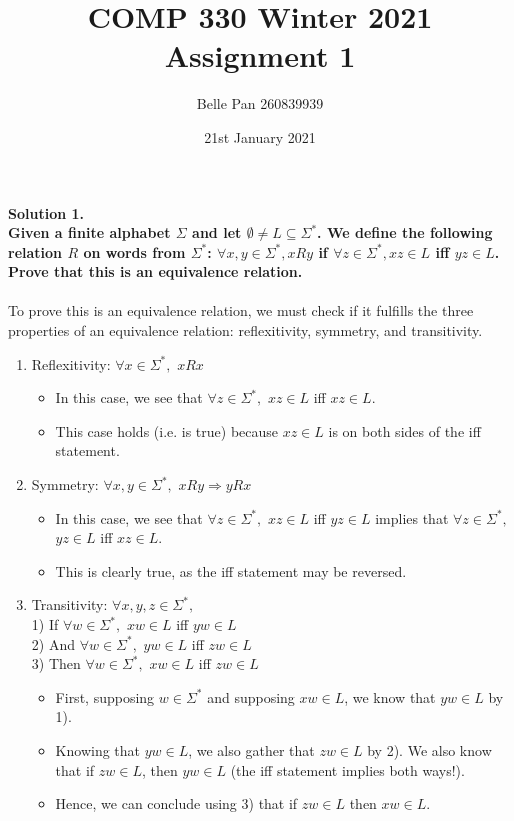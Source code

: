\documentclass{article}
\title{ COMP 330 Winter 2021 \\ Assignment 1}
\author{Belle Pan 260839939}
\date{21st January 2021}
\begin{document}
\maketitle

\noindent \textbf{Solution 1. 
\\Given a finite alphabet \(\Sigma\) and let \(\emptyset \neq L \subseteq \Sigma ^*\). 
We define the following relation \(R\) on words from \(\Sigma ^*\): 
\(\forall x, y \in \Sigma ^*, xRy\) if \(\forall z \in \Sigma^*, xz \in L\) iff \(yz \in L\).
Prove that this is an equivalence relation.}
\\
\\To prove this is an equivalence relation, we must check if it fulfills the three properties of an equivalence relation: reflexitivity, symmetry, and transitivity.
\begin{enumerate}
    \item Reflexitivity: \(\forall x \in \Sigma ^ *,\) \(xRx\)
    \begin{itemize}
        \item In this case, we see that \(\forall z \in \Sigma^*,\) \(xz \in L\) iff \(xz \in L\).
        \item This case holds (i.e. is true) because \(xz \in L\) is on both sides of the iff statement.
    \end{itemize}
    \item Symmetry: \(\forall x,y \in \Sigma ^ *,\) \(xRy \Longrightarrow yRx\)
    \begin{itemize}
        \item In this case, we see that \(\forall z \in \Sigma^*,\) \(xz \in L\) iff \(yz \in L\) implies that \(\forall z \in \Sigma^*,\) \(yz \in L\) iff \(xz \in L\).
        \item This is clearly true, as the iff statement may be reversed.
    \end{itemize}
    \item Transitivity: \(\forall x,y,z \in \Sigma ^ *,\)
    \\1) If \(\forall w \in \Sigma^*,\) \(xw \in L\) iff \(yw \in L\)
    \\2) And \(\forall w \in \Sigma^*,\) \(yw \in L\) iff \(zw \in L\)
    \\3) Then \(\forall w \in \Sigma^*,\) \(xw \in L\) iff \(zw \in L\)
    \begin{itemize}
        \item First, supposing \(w\in \Sigma ^ *\) and supposing \(xw \in L\), we know that \(yw\in L\) by 1).
        \item Knowing that \(yw\in L\), we also gather that \(zw\in L\) by 2). We also know that if \(zw\in L\), then \(yw\in L\) (the iff statement implies both ways!).
        \item Hence, we can conclude using 3) that if \(zw\in L\) then \(xw \in L\).
    \end{itemize}
\end{enumerate}
\end{document}

